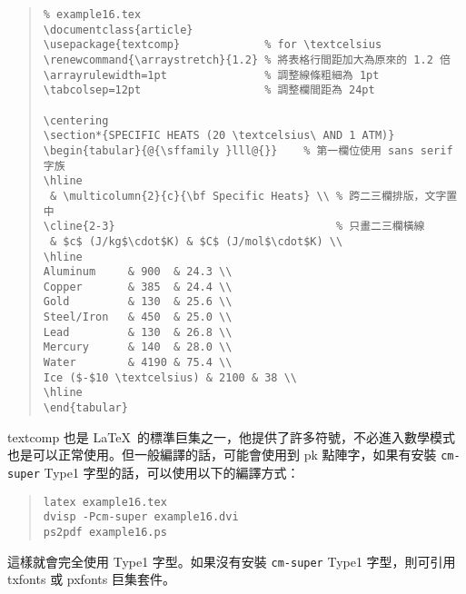 \begin{quote}
  \begin{verbatim}
% example16.tex
\documentclass{article}
\usepackage{textcomp}             % for \textcelsius
\renewcommand{\arraystretch}{1.2} % 將表格行間距加大為原來的 1.2 倍
\arrayrulewidth=1pt               % 調整線條粗細為 1pt
\tabcolsep=12pt                   % 調整欄間距為 24pt

\centering
\section*{SPECIFIC HEATS (20 \textcelsius\ AND 1 ATM)}
\begin{tabular}{@{\sffamily }lll@{}}    % 第一欄位使用 sans serif 字族
\hline
 & \multicolumn{2}{c}{\bf Specific Heats} \\ % 跨二三欄排版，文字置中
\cline{2-3}                                  % 只畫二三欄橫線
 & $c$ (J/kg$\cdot$K) & $C$ (J/mol$\cdot$K) \\
\hline
Aluminum     & 900  & 24.3 \\
Copper       & 385  & 24.4 \\
Gold         & 130  & 25.6 \\
Steel/Iron   & 450  & 25.0 \\
Lead         & 130  & 26.8 \\
Mercury      & 140  & 28.0 \\
Water        & 4190 & 75.4 \\
Ice ($-$10 \textcelsius) & 2100 & 38 \\
\hline
\end{tabular}

\end{verbatim}
\end{quote}

\textsf{textcomp} 也是 \LaTeX\ 的標準巨集之一，他提供了許多符號，不必進入數學模式也是可以正常使用。但一般編譯的話，可能會使用到 pk 點陣字，如果有安裝 \texttt{cm-super} Type1 字型的話，可以使用以下的編譯方式：

\begin{quote}
  \begin{verbatim}
latex example16.tex
dvisp -Pcm-super example16.dvi
ps2pdf example16.ps
\end{verbatim}
\end{quote}

這樣就會完全使用 Type1 字型。如果沒有安裝 \texttt{cm-super} Type1 字型，則可引用 \textsf{txfonts} 或 \textsf{pxfonts} 巨集套件。

